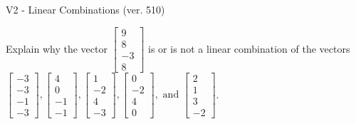 \begin{exercise}
  \begin{exerciseTitle}V2 - Linear Combinations (ver. 510)\end{exerciseTitle}
  \begin{exerciseStatement}
    Explain why the vector \(\left[\begin{array}{c}
9 \\
8 \\
-3 \\
8
\end{array}\right]\)  is or is not a linear 
	combination of the vectors \(\left[\begin{array}{c}
-3 \\
-3 \\
-1 \\
-3
\end{array}\right] , \left[\begin{array}{c}
4 \\
0 \\
-1 \\
-1
\end{array}\right] , \left[\begin{array}{c}
1 \\
-2 \\
4 \\
-3
\end{array}\right] , \left[\begin{array}{c}
0 \\
-2 \\
4 \\
0
\end{array}\right] , \text{ and } \left[\begin{array}{c}
2 \\
1 \\
3 \\
-2
\end{array}\right]\).
	



\end{exerciseStatement}
\end{exercise}
